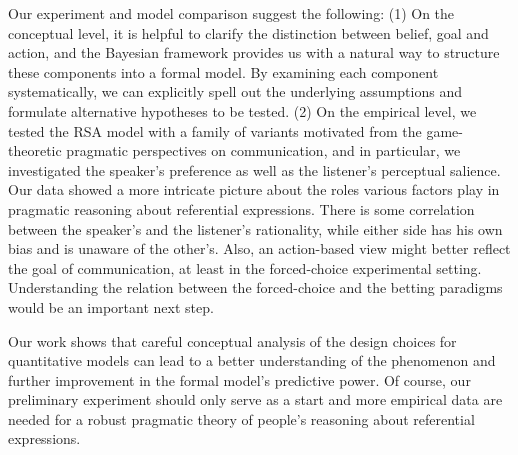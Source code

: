 Our experiment and model comparison suggest the following: (1) On the conceptual level, 
it is helpful to clarify the distinction between belief, goal and action, and the Bayesian framework provides us with a natural way to structure these components into a formal model. By examining each component systematically, we can explicitly spell out the underlying assumptions and formulate alternative hypotheses to be tested. (2) On the empirical level, we tested the RSA model with a family of variants motivated from the game-theoretic pragmatic perspectives on communication, and in particular, we investigated the speaker's preference as well as the listener's perceptual salience. Our data showed a more intricate picture about the roles various factors play in pragmatic reasoning about referential expressions. There is some correlation between the speaker's and the listener's rationality,  while either side has his own bias and is unaware of the other's. Also, an action-based view might better reflect the goal of communication, at least in the forced-choice experimental setting. Understanding the relation between the forced-choice and the betting paradigms would be an important next step.

Our work shows that careful conceptual analysis of the design choices for quantitative models can lead to a better understanding of the phenomenon and further improvement in the formal model's predictive power. Of course, our preliminary experiment should only serve as a start and more empirical data are needed for a robust pragmatic theory of people's reasoning about referential expressions. 

